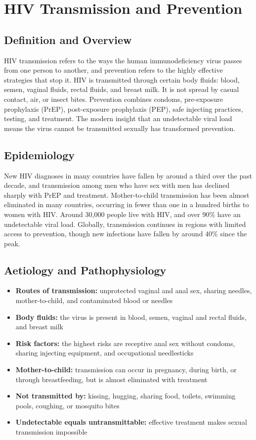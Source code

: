 \chapter{HIV Transmission and Prevention}

\section*{Definition and Overview}
HIV transmission refers to the ways the human immunodeficiency virus passes from one person to another, and prevention refers to the highly effective strategies that stop it. HIV is transmitted through certain body fluids: blood, semen, vaginal fluids, rectal fluids, and breast milk. It is not spread by casual contact, air, or insect bites. Prevention combines condoms, pre-exposure prophylaxis (PrEP), post-exposure prophylaxis (PEP), safe injecting practices, testing, and treatment. The modern insight that an undetectable viral load means the virus cannot be transmitted sexually has transformed prevention.

\section*{Epidemiology}
New HIV diagnoses in many countries have fallen by around a third over the past decade, and transmission among men who have sex with men has declined sharply with PrEP and treatment. Mother-to-child transmission has been almost eliminated in many countries, occurring in fewer than one in a hundred births to women with HIV. Around 30,000 people live with HIV, and over 90\% have an undetectable viral load. Globally, transmission continues in regions with limited access to prevention, though new infections have fallen by around 40\% since the peak.

\section*{Aetiology and Pathophysiology}
\begin{itemize}
    \item \textbf{Routes of transmission:} unprotected vaginal and anal sex, sharing needles, mother-to-child, and contaminated blood or needles
    \item \textbf{Body fluids:} the virus is present in blood, semen, vaginal and rectal fluids, and breast milk
    \item \textbf{Risk factors:} the highest risks are receptive anal sex without condoms, sharing injecting equipment, and occupational needlesticks
    \item \textbf{Mother-to-child:} transmission can occur in pregnancy, during birth, or through breastfeeding, but is almost eliminated with treatment
    \item \textbf{Not transmitted by:} kissing, hugging, sharing food, toilets, swimming pools, coughing, or mosquito bites
    \item \textbf{Undetectable equals untransmittable:} effective treatment makes sexual transmission impossible
\end{itemize}

